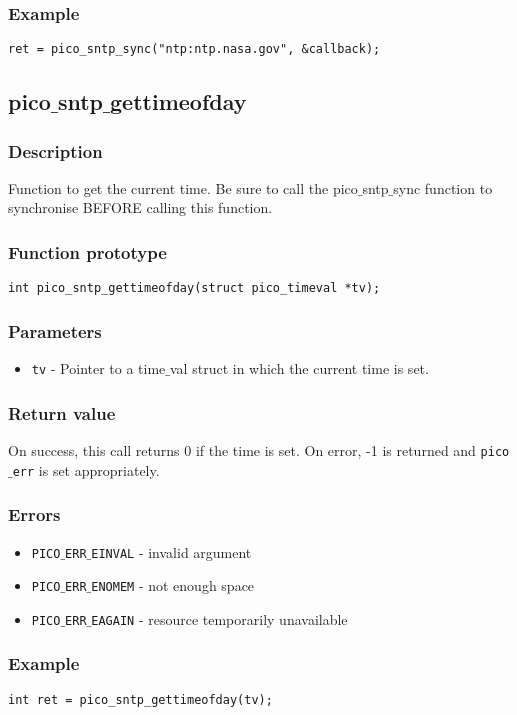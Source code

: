 \subsubsection*{Example}
\begin{verbatim}
ret = pico_sntp_sync("ntp:ntp.nasa.gov", &callback);
\end{verbatim}



\subsection{pico$\_$sntp$\_$gettimeofday}

\subsubsection*{Description}
Function to get the current time. Be sure to call the pico$\_$sntp$\_$sync function to synchronise BEFORE calling this function.

\subsubsection*{Function prototype}
\begin{verbatim}
int pico_sntp_gettimeofday(struct pico_timeval *tv);
\end{verbatim}

\subsubsection*{Parameters}
\begin{itemize}[noitemsep]
\item \texttt{tv} - Pointer to a time$\_$val struct in which the current time is set.
\end{itemize}

\subsubsection*{Return value}
On success, this call returns 0 if the time is set.
On error, -1 is returned and \texttt{pico$\_$err} is set appropriately.

\subsubsection*{Errors}
\begin{itemize}[noitemsep]
\item \texttt{PICO$\_$ERR$\_$EINVAL} - invalid argument
\item \texttt{PICO$\_$ERR$\_$ENOMEM} - not enough space
\item \texttt{PICO$\_$ERR$\_$EAGAIN} - resource temporarily unavailable
\end{itemize}

\subsubsection*{Example}
\begin{verbatim}
int ret = pico_sntp_gettimeofday(tv);
\end{verbatim}




